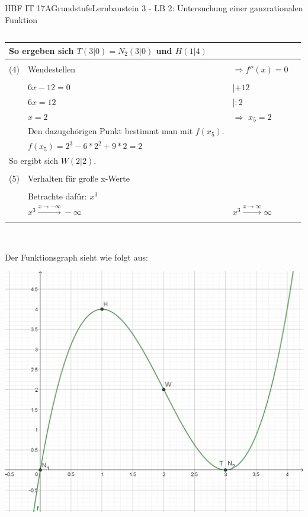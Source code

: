 \documentclass[oneside,openany,headings=optiontotoc,11pt,numbers=noenddot]{scrreprt}
\begin{document}
\begin{worksheet}{HBF IT 17A}{Grundstufe}{Lernbaustein 3 - LB 2: Untersuchung einer ganzrationalen Funktion}
\begin{framed}
\begin{tabularx}{\textwidth}{lXXl}
			\end{tabularx}
			\begin{tabularx}{\textwidth}{lXXl}
				\multicolumn{2}{l}{So ergeben sich \colorbox{blue!5}{\(T(3|0) = N_2(3|0)\)} und \colorbox{blue!5}{\(H(1|4)\)}}\\
				\hline\hline\\
				(4) & Wendestellen & \(\Rightarrow f''(x) = 0\)\\
				\hline\\
				& \(6x -12 = 0\) & |\(+12\)\\
				& \(6x = 12\) & |\(:2\)\\
				& \(x = 2\) & \(\Rightarrow\) \colorbox{green!10}{\(x_5 = 2\)}\\
				& Den dazugehörigen Punkt bestimmt man mit \(f(x_5)\).\\
				& \(f(x_5) = 2^3 -6*2^2 +9*2 = 2\)\\
				\multicolumn{2}{l}{So ergibt sich \colorbox{blue!5}{\(W(2|2)\)}.}\\
				\hline\hline\\
				(5) & Verhalten für große x-Werte\\
				\hline\\
				& Betrachte dafür: \(x^3\)\\
				& \colorbox{green!10}{\(x^3\xrightarrow{x\rightarrow-\infty}-\infty\)} & \colorbox{green!10}{\(x^3\xrightarrow{x\rightarrow\infty}\infty\)}\\
				\hline\hline\\
			\end{tabularx}\\
			\par\noindent
			Der Funktionsgraph sieht wie folgt aus:\\
			\par
			\includegraphics[scale=0.4]{Bilder/HAc.png}

\end{framed}
\end{worksheet}
\end{document}

